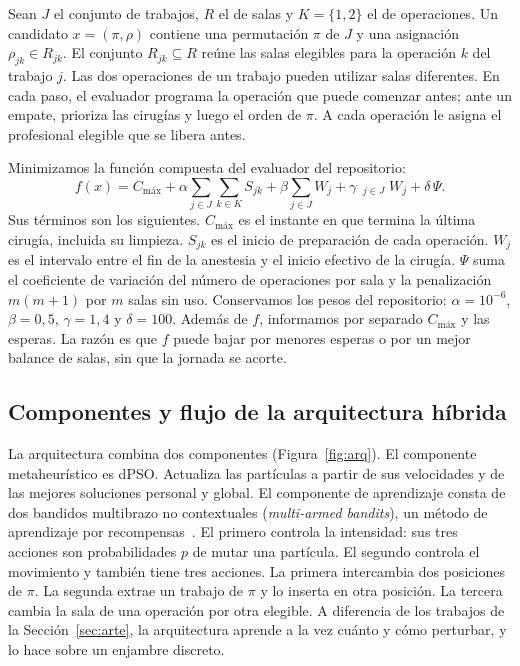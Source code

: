 \documentclass[10pt,a4paper]{article}
\DeclareMathOperator*{\maxop}{m\acute{a}x}
\newcommand{\Cmax}{C_{\text{máx}}}
\newcommand{\dc}{{,}}%
\begin{document}
Sean $J$ el conjunto de trabajos, $R$ el de salas y $K=\{1,2\}$ el de operaciones. Un candidato
$x=(\pi,\rho)$ contiene una permutación $\pi$ de $J$ y una asignación $\rho_{jk}\in R_{jk}$. El
conjunto $R_{jk}\subseteq R$ reúne las salas elegibles para la operación $k$ del trabajo $j$.
Las dos operaciones de un trabajo pueden utilizar salas diferentes. En cada paso, el evaluador
programa la operación que puede comenzar antes; ante un empate, prioriza las cirugías y luego el
orden de $\pi$. A cada operación le asigna el profesional elegible que se libera antes.

Minimizamos la función compuesta del evaluador del repositorio:
\begin{equation}
f(x)=\Cmax+\alpha\sum_{j\in J}\sum_{k\in K}S_{jk}+\beta\sum_{j\in J}W_j
+\gamma\,\maxop_{j\in J}W_j+\delta\,\Psi .
\label{eq:f}
\end{equation}
Sus términos son los siguientes. $\Cmax$ es el instante en que termina la última cirugía,
incluida su limpieza. $S_{jk}$ es el inicio de preparación de cada operación. $W_j$ es el intervalo entre
el fin de la anestesia y el inicio efectivo de la cirugía. $\Psi$ suma el coeficiente de
variación del número de operaciones por sala y la penalización $m(m+1)$ por $m$ salas sin uso.
Conservamos los pesos del repositorio: $\alpha=10^{-6}$, $\beta=0\dc5$, $\gamma=1\dc4$ y
$\delta=100$. Además de $f$, informamos por separado $\Cmax$ y las esperas. La razón es que
$f$ puede bajar por menores esperas o por un mejor balance de salas, sin que la jornada se acorte.

\subsection{Componentes y flujo de la arquitectura híbrida}

La arquitectura combina dos componentes (Figura~\ref{fig:arq}). El componente metaheurístico
es dPSO. Actualiza las partículas a partir de sus velocidades y de las mejores soluciones
personal y global. El componente de aprendizaje consta de dos bandidos multibrazo no
contextuales (\emph{multi-armed bandits}), un método de aprendizaje por
recompensas~\cite{sutton2018}. El primero controla la intensidad: sus tres acciones son
probabilidades $p$ de mutar una partícula. El segundo controla el movimiento y también tiene
tres acciones. La primera intercambia dos posiciones de $\pi$. La segunda extrae un trabajo de
$\pi$ y lo inserta en otra posición. La tercera cambia la sala de una operación por otra
elegible. A diferencia de los trabajos de la Sección~\ref{sec:arte}, la arquitectura aprende a
la vez cuánto y cómo perturbar, y lo hace sobre un enjambre discreto.
\end{document}

